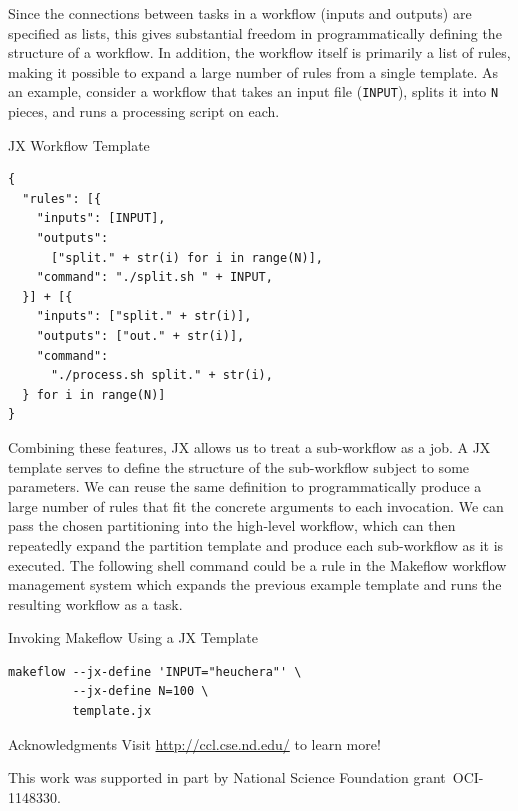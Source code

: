\documentclass{beamer}
\newcommand{\jx}{JX\xspace}
\newcommand{\mf}{Makeflow\xspace}
\begin{document}
\begin{frame}[fragile]
\begin{minipage}[t][0.95\textheight]{0.33\textwidth}
\vfill

\begin{block}{}
\parbox{\linewidth}{Since the connections between tasks in a workflow (inputs and outputs) are specified as lists,
this gives substantial freedom in programmatically defining the structure of a workflow.
In addition, the workflow itself is primarily a list of rules,
making it possible to expand a large number of rules from a single template.
As an example, consider a workflow that takes an input file (\texttt{INPUT}),
splits it into \texttt{N} pieces,
and runs a processing script on each.}
\end{block}

\begin{exampleblock}{JX Workflow Template\rule{0pt}{2.1ex}}
\begin{verbatim}
{
  "rules": [{
    "inputs": [INPUT],
    "outputs":
      ["split." + str(i) for i in range(N)],
    "command": "./split.sh " + INPUT,
  }] + [{
    "inputs": ["split." + str(i)],
    "outputs": ["out." + str(i)],
    "command":
      "./process.sh split." + str(i),
  } for i in range(N)]
}
\end{verbatim}
\end{exampleblock}

\vfill

\begin{block}{}
\parbox{\linewidth}{Combining these features,
\jx allows us to treat a sub-workflow as a job.
A \jx template serves to define the structure of the sub-workflow subject to some parameters.
We can reuse the same definition to programmatically produce a large number of rules that fit the concrete arguments to each invocation.
We can pass the chosen partitioning into the high-level workflow,
which can then repeatedly expand the partition template and produce each sub-workflow as it is executed.
The following shell command could be a rule in the \mf workflow management system which expands the previous example template and runs the resulting workflow as a task.}
\end{block}

\begin{exampleblock}{Invoking Makeflow Using a JX Template\rule{0pt}{2.1ex}}
\begin{verbatim}
makeflow --jx-define 'INPUT="heuchera"' \
         --jx-define N=100 \
         template.jx
\end{verbatim}
\end{exampleblock}

\vfill

\begin{alertblock}{Acknowledgments}
Visit \url{http://ccl.cse.nd.edu/} to learn more!

This work was supported in part by National Science Foundation grant~OCI-1148330.
\end{alertblock}

\end{minipage}
\end{frame}
\end{document}
